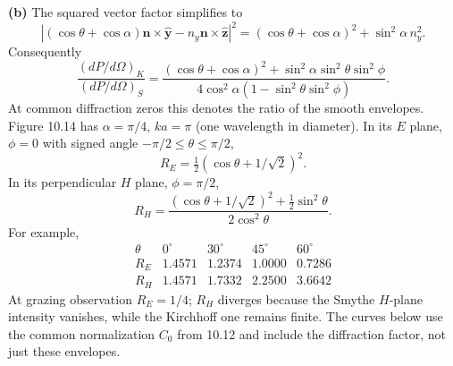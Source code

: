 \textbf{(b)} The squared vector factor simplifies to
\[
|(\cos\theta+\cos\alpha)\mathbf n\times\widehat{\mathbf y}
-n_y\mathbf n\times\widehat{\mathbf z}|^2
=(\cos\theta+\cos\alpha)^2+\sin^2\alpha\,n_y^2 .
\]
Consequently
\[
\boxed{\frac{(dP/d\Omega)_K}{(dP/d\Omega)_S}
=\frac{(\cos\theta+\cos\alpha)^2+
\sin^2\alpha\sin^2\theta\sin^2\phi}
{4\cos^2\alpha(1-\sin^2\theta\sin^2\phi)}.}
\]
At common diffraction zeros this denotes the ratio of the smooth
envelopes. Figure 10.14 has $\alpha=\pi/4$, $ka=\pi$ (one wavelength
in diameter). In its $E$ plane, $\phi=0$ with signed angle
$-\pi/2\leq\theta\leq\pi/2$,
\[
R_E=\tfrac12(\cos\theta+1/\sqrt2)^2 .
\]
In its perpendicular $H$ plane, $\phi=\pi/2$,
\[
R_H=\frac{(\cos\theta+1/\sqrt2)^2+\tfrac12\sin^2\theta}
{2\cos^2\theta}.
\]
For example,
\[
\begin{array}{c|rrrr}
\theta&0^\circ&30^\circ&45^\circ&60^\circ\\ \hline
R_E&1.4571&1.2374&1.0000&0.7286\\
R_H&1.4571&1.7332&2.2500&3.6642
\end{array}
\]
At grazing observation $R_E=1/4$; $R_H$ diverges because the Smythe
$H$-plane intensity vanishes, while the Kirchhoff one remains finite.
The curves below use the common normalization $C_0$ from 10.12 and
include the diffraction factor, not just these envelopes.
\begin{center}\end{center}

